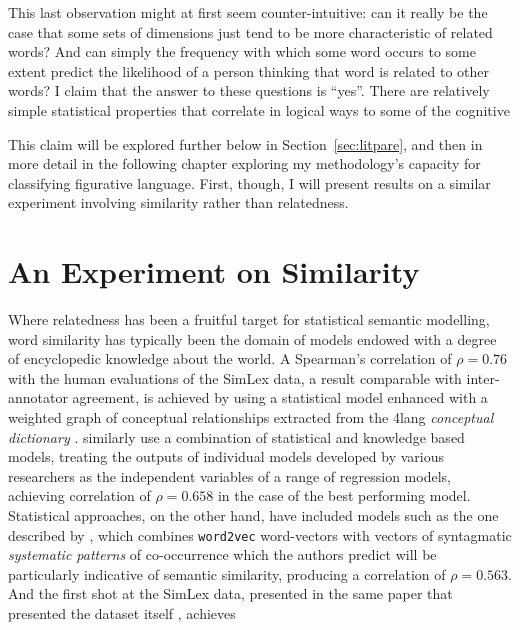 This last observation might at first seem counter-intuitive: can it really be the case that some sets of dimensions just tend to be more characteristic of related words?  And can simply the frequency with which some word occurs to some extent predict the likelihood of a person thinking that word is related to other words?  I claim that the answer to these questions is ``yes''.  There are relatively simple statistical properties that correlate in logical ways to some of the cognitive 

This claim will be explored further below in Section~\ref{sec:litpare}, and then in more detail in the following chapter exploring my methodology's capacity for classifying figurative language.  First, though, I will present results on a similar experiment involving similarity rather than relatedness.

\section{An Experiment on Similarity}
Where relatedness has been a fruitful target for statistical semantic modelling, word similarity has typically been the domain of models endowed with a degree of encyclopedic knowledge about the world.  A Spearman's correlation of $\rho = 0.76$ with the human evaluations of the SimLex data, a result comparable with inter-annotator agreement, is achieved by \cite{RecksiEA2016} using a statistical model enhanced with a weighted graph of conceptual relationships extracted from the 4lang \emph{conceptual dictionary} \citep{KornaiEA2015}.  \cite{BanjadeEA2015} similarly use a combination of statistical and knowledge based models, treating the outputs of individual models developed by various researchers as the independent variables of a range of regression models, achieving correlation of $\rho = 0.658$ in the case of the best performing model.  Statistical approaches, on the other hand, have included models such as the one described by \cite{SchwartzEA2015}, which combines \texttt{word2vec} word-vectors with vectors of syntagmatic \emph{systematic patterns} of co-occurrence which the authors predict will be particularly indicative of semantic similarity, producing a correlation of $\rho = 0.563$.  And the first shot at the SimLex data, presented in the same paper that presented the dataset itself \citep{HillEA2015}, achieves


